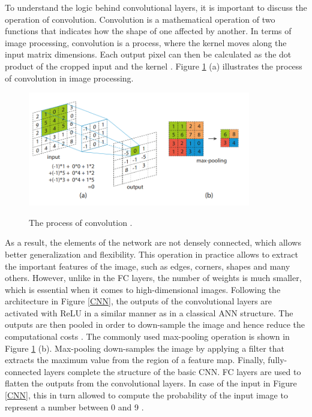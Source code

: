 \documentclass[english, 12pt, a4paper, elec, utf8, a-1b, online]{aaltothesis}
\begin{document}
To understand the logic behind convolutional layers, it is important to discuss the operation of convolution. Convolution is a mathematical operation of two functions that indicates how the shape of one affected by another. In terms of image processing, convolution is a process, where the kernel moves along the input matrix dimensions. Each output pixel can then be calculated as the dot product of the cropped input and the kernel \cite{Liu2016}. Figure \ref{CNN_1} (a) illustrates the process of convolution in image processing.  
\begin{figure}[htb]
	\begin{center}
		\includegraphics[height=5cm]{./CNN_1.png}
	\end{center}
	\caption{The process of convolution \cite{Liu2016}.}
	\begin{center}
		\label{CNN_1}
	\end{center}
\end{figure}
\FloatBarrier

As a result, the elements of the network  are not densely connected, which allows better generalization and flexibility. This operation in practice allows to extract the important features of the image, such as edges, corners, shapes and many others.  However, unlike in the FC layers, the number of weights is much smaller, which is essential when it comes to high-dimensional images. Following the architecture in Figure \ref{CNN}, the outputs of the convolutional layers are activated with ReLU in a similar manner as in a classical ANN structure. The outputs are then pooled in order to down-sample the image and hence reduce the computational costs \cite{Liu2016}. The commonly used max-pooling operation is shown in Figure \ref{CNN_1} (b). Max-pooling down-samples the image by applying a filter that extracts the maximum value from the region of a feature map. Finally, fully-connected layers complete the structure of the basic CNN. FC layers are used to flatten the outputs from the convolutional layers. In case of the input in Figure \ref{CNN}, this in turn allowed to compute the probability of the input image to represent a number between 0 and 9 \cite{Mahony2019}.
\end{document}
